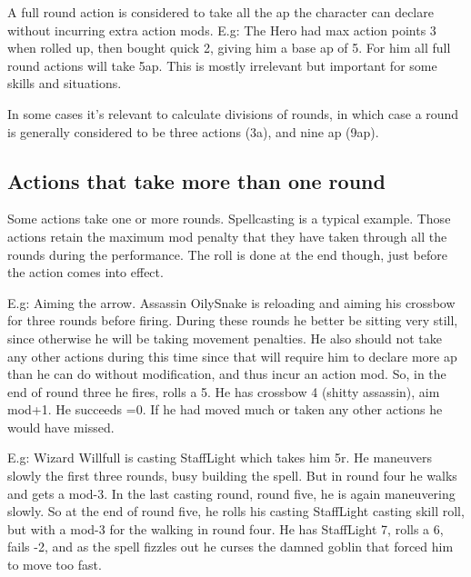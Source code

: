 A full round action is considered to take all the ap the character can declare without incurring extra action mods. E.g: The Hero had max action points 3 when rolled up, then bought quick 2, giving him a base ap of 5. For him all full round actions will take 5ap. This is mostly irrelevant but important for some skills and situations.

In some cases it's relevant to calculate divisions of rounds, in which case a round is generally considered to be three actions (3a), and nine ap (9ap). 



\subsection*{Actions that take more than one round}
\label{multiroundactions}
Some actions take one or more rounds. Spellcasting is a typical example. Those actions retain the maximum mod penalty that they have taken through all the rounds during the performance. The roll is done at the end though, just before the action comes into effect.

E.g: Aiming the arrow. Assassin OilySnake is reloading and aiming his crossbow for three rounds before firing. During these rounds he better be sitting very still, since otherwise he will be taking movement penalties. He also should not take any other actions during this time since that will require him to declare more ap than he can do without modification, and thus incur an action mod. So, in the end of round three he fires, rolls a 5. He has crossbow 4 (shitty assassin), aim mod+1. He succeeds =0. If he had moved much or taken any other actions he would have missed.

E.g: Wizard Willfull is casting StaffLight which takes him 5r. He maneuvers slowly the first three rounds, busy building the spell. But in round four he walks and gets a mod-3. In the last casting round, round five, he is again maneuvering slowly. So at the end of round five, he rolls his casting StaffLight casting skill roll, but with a mod-3 for the walking in round four. He has StaffLight 7, rolls a 6, fails -2, and as the spell fizzles out he curses the damned goblin that forced him to move too fast.












